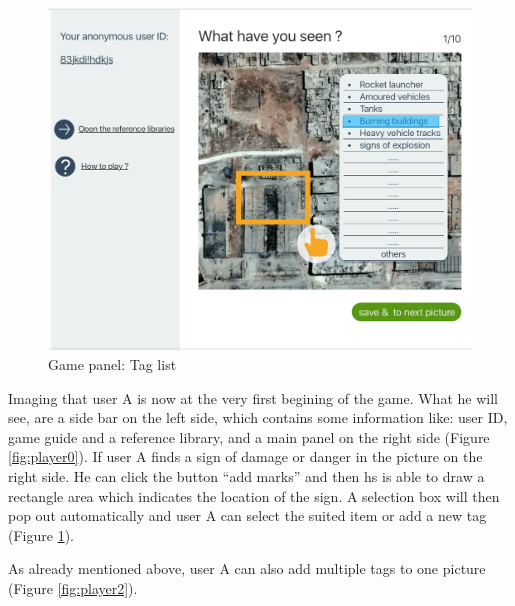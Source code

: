       \noindent\begin{minipage}{.45\textwidth}
      \begin{figure}[H]
      \centering
      \includegraphics[width=\textwidth]{figures/function-player-1}
      \caption{Game panel: Tag list \cite{satellite-photo-1}}
      \label{fig:player1}
      \end{figure}
      \end{minipage}\hfill

      Imaging that user A is now at the very first begining of the game.
      What he will see,
      are a side bar on the left side,
      which contains some information like:
      user ID,
      game guide and a reference library,
      and a main panel on the right side (Figure \ref{fig:player0}).
      If user A finds a sign of damage or danger in the picture on the right side.
      He can click the button ``add marks'' and then hs is able to draw a rectangle area which indicates the location of the sign.
      A selection box will then pop out automatically and user A can select the suited item or add a new tag (Figure \ref{fig:player1}).

      As already mentioned above,
      user A can also add multiple tags to one picture (Figure \ref{fig:player2}).


